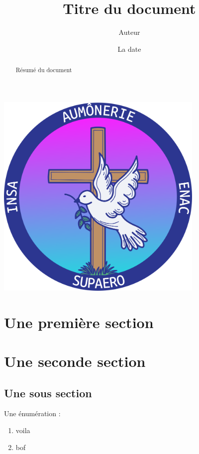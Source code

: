 \documentclass[12pt]{article}
\title{Titre du document}
\author{Auteur}
\date{La date}
\begin{document}
    \maketitle

    \begin{center}
      \includegraphics[width=10cm]{logoAumonerie.png}
    \end{center}

    \begin{abstract}
        Résumé du document
    \end{abstract}

    \newpage
    \AddToShipoutPicture{\BackgroundPic} 
    \fontsize{12}{12}\selectfont
    \tableofcontents %
    \newpage %
    
    \section{Une première section}
    
    \section{Une seconde section}
    
    \subsection{Une sous section}

    Une énumération :
    \begin{enumerate}
        \item voila
        \item bof
    \end{enumerate}
\end{document}
